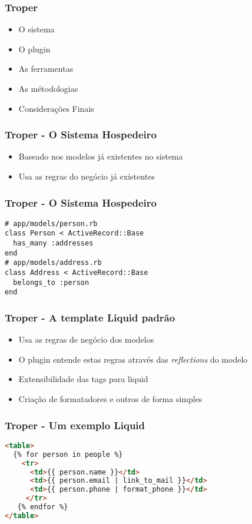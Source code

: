 \documentclass{beamer}
\begin{document}
 
\begin{frame} 
\frametitle{Troper} 
\begin{itemize} 
\item O sistema
\item O plugin
\item As ferramentas 
\item As métodologias
\item Considerações Finais
\end{itemize} 
\end{frame} 

\begin{frame} 
\frametitle{Troper - O Sistema Hospedeiro} 
\begin{itemize} 
  \item Baseado nos modelos já existentes no sistema
  \item Usa as regras do negócio já existentes
\end{itemize} 
\end{frame} 

\begin{frame}[fragile]
\frametitle{Troper - O Sistema Hospedeiro} 
\begin{lstlisting}[caption=Modelo ActiveRecord]
# app/models/person.rb
class Person < ActiveRecord::Base
  has_many :addresses
end
# app/models/address.rb
class Address < ActiveRecord::Base
  belongs_to :person 
end
\end{lstlisting}
\end{frame}

\begin{frame} 
\frametitle{Troper - A template Liquid padrão } 
\begin{itemize} 
  \item Usa as regras de negócio dos modelos
  \item O plugin entende estas regras através das \textit{reflections} do modelo
  \item Extensibilidade das tags para liquid
  \item Criação de formatadores e outros de forma simples 
\end{itemize} 
\end{frame} 

\begin{frame}[fragile]
\frametitle{Troper - Um exemplo Liquid} 
\begin{lstlisting}[language=html, caption=Template do Liquid]
<table>
  {% for person in people %}
    <tr>
      <td>{{ person.name }}</td>
      <td>{{ person.email | link_to_mail }}</td>
      <td>{{ person.phone | format_phone }}</td>
     </tr>
   {% endfor %}      
</table>
\end{lstlisting}
\end{frame}
\end{document}

